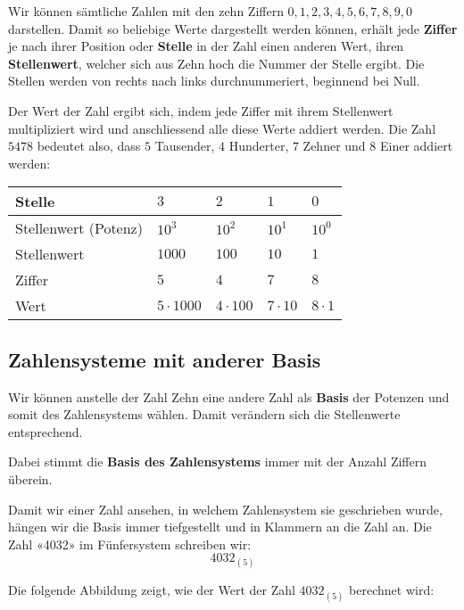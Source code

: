 Wir können sämtliche Zahlen mit den zehn Ziffern $0, 1, 2, 3, 4, 5, 6, 7, 8, 9, 0$ darstellen. Damit so beliebige Werte dargestellt werden können, erhält jede \textbf{Ziffer} je nach ihrer Position oder \textbf{Stelle} in der Zahl einen anderen Wert, ihren \textbf{Stellenwert}, welcher sich aus Zehn hoch die Nummer der Stelle ergibt. Die Stellen werden von rechts nach links durchnummeriert, beginnend bei Null.

Der Wert der Zahl ergibt sich, indem jede Ziffer mit ihrem Stellenwert multipliziert wird und anschliessend alle diese Werte addiert werden. Die Zahl $5478$ bedeutet also, dass $5$ Tausender, $4$ Hunderter, $7$ Zehner und $8$ Einer addiert werden:

\begin{center}
  \renewcommand{\arraystretch}{1}
  \begin{tabularx}{0.9\textwidth}{lCCCC}
  \toprule
    Stelle & $3$ & $2$ & $1$ & $0$ \\
  \midrule
    Stellenwert (Potenz) & $10^{3}$ & $10^{2}$ & $10^{1}$ & $10^{0}$ \\
  \midrule
    Stellenwert & $1000$ & $100$ & $10$ & $1$ \\
  \midrule
    Ziffer & $5$ & $4$ & $7$ & $8$ \\
  \midrule
    Wert & $5\cdot 1000$ & $4\cdot 100$ & $7\cdot 10$ & $8\cdot 1$ \\
  \bottomrule
  \end{tabularx}
\end{center}

\subsection{Zahlensysteme mit anderer Basis}

Wir können anstelle der Zahl Zehn eine andere Zahl als \textbf{Basis} der Potenzen und somit des Zahlensystems wählen. Damit verändern sich die Stellenwerte entsprechend.

Dabei stimmt die \textbf{Basis des Zahlensystems} immer mit der Anzahl Ziffern überein.

Damit wir einer Zahl ansehen, in welchem Zahlensystem sie geschrieben wurde, hängen wir die Basis immer tiefgestellt und in Klammern an die Zahl an. Die Zahl «4032» im Fünfersystem schreiben wir:
\[
  4032_{(5)}
\]

Die folgende Abbildung zeigt, wie der Wert der Zahl $4032_{(5)}$ berechnet wird:


